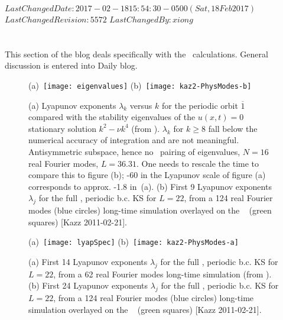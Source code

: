 \ifsvnmulti
{}
{$LastChangedDate: 2017-02-18 15:54:30 -0500 (Sat, 18 Feb 2017) $}
{$LastChangedRevision: 5572 $} {$LastChangedBy: xiong $}
\fi

\chapter{\KS}
\label{sect:LyapKS}

This section of the blog deals specifically with the
\KS\ calculations. General discussion is entered into
 {Daily blog}.

\begin{figure}
  (a)~\texttt{[image: eigenvalues]}
  (b)~\texttt{[image: kaz2-PhysModes-b]}
  \caption{
    (a)
    Lyapunov exponents $\lambda_k$ versus $k$ for the periodic
    orbit $\overline{1}$ compared with  the stability eigenvalues
    of the $u(x,t)=0$ stationary solution $k^2- \nu k^4$ (from
    ). $\lambda_k$ for $k \geq 8$ fall
    below the numerical accuracy of integration and are not
    meaningful. Antisymmetric subspace,
    hence no \ pairing of eigenvalues, $N=16$ real Fourier
    modes, $L=36.31$. One needs to rescale the time to compare
    this to figure (b); -60 in the Lyapunov scale of figure (a)
    corresponds to approx. -1.8 in \,(a).
    (b)
    First 9 Lyapunov exponents $\lambda_j$ for the full
    \statesp, periodic b.c. KS for $L=22$, from a 124 real Fourier
    modes (blue circles) long-time simulation overlayed on
    the \po\  (green squares) [Kazz 2011-02-21].
  }
  \label{fig:lyapSpec1}
\end{figure}

\begin{figure}
  (a)~\texttt{[image: lyapSpec]}
  (b)~\texttt{[image: kaz2-PhysModes-a]}
  \caption{
    (a)
    First 14 Lyapunov exponents $\lambda_j$ for the full
    \statesp, periodic b.c. KS for $L=22$, from a 62 real Fourier
    modes long-time simulation (from ).
    (b)
    First 24 Lyapunov exponents $\lambda_j$ for the full
    \statesp, periodic b.c. KS for $L=22$, from a 124 real Fourier
    modes (blue circles) long-time simulation overlayed on
    the \po\  (green squares) [Kazz 2011-02-21].
  }
  \label{fig:lyapSpec}
\end{figure}

